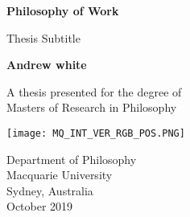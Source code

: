 

\begin{titlepage} %
   \begin{center} %
       \vspace*{1cm} %
 
        \Huge %
        \textbf{Philosophy of Work} %
 
        \LARGE %
        \vspace{0.5cm} %
        Thesis Subtitle
 
        \vspace{1.5cm} %
 
        \textbf{Andrew white}
 
        \vfill %
 
       A thesis presented for the degree of\\
       Masters of Research in Philosophy
 
       \vspace{0.8cm}
 
       \texttt{[image: MQ\_INT\_VER\_RGB\_POS.PNG]} %
 
    \large  %
       Department of Philosophy\\
       Macquarie University\\
       Sydney, Australia\\
       October 2019
 
   \end{center} %
\end{titlepage} %
